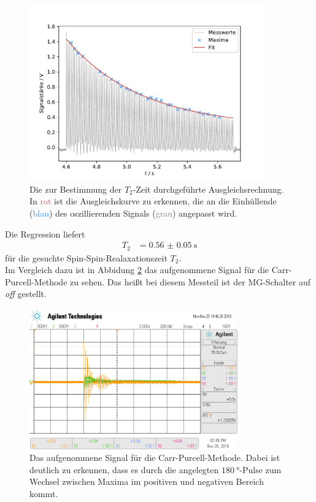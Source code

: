 \begin{figure}[H]
  \centering
  \includegraphics[width=0.9\textwidth]{../Auswertung/T2_fit.pdf}
  \caption{Die zur Bestimmung der $T_2$-Zeit durchgeführte Ausgleichsrechnung. In \textcolor{indianred}{rot} ist die Ausgleichskurve zu erkennen,
  die an die Einhüllende (\textcolor{dodgerblue}{blau}) des oszillierenden Signals (\textcolor{gray}{grau}) angepasst wird.}
  \label{fig:T2_fit}
\end{figure} \noindent
Die Regression liefert
\begin{align}
  T_2 &=  \SI{0.56(005)}{\second}
\end{align}
für die gesuchte Spin-Spin-Realaxationszeit $T_2$. \\
Im Vergleich dazu ist in Abbidung \ref{fig:t2_off} das aufgenommene Signal für die Carr-Purcell-Methode zu sehen. Das heißt bei diesem 
Messteil ist der MG-Schalter auf \textit{off} gestellt.
\begin{figure}[H]
  \centering
  \includegraphics[width=0.8\textwidth]{../data/scope_76.png}
  \caption{Das aufgenommene Signal für die Carr-Purcell-Methode. Dabei ist deutlich zu erkennen, dass es durch die angelegten
  $\SI{180}{\degree}$-Pulse zum Wechsel zwischen Maxima im positiven und negativen Bereich kommt.}
  \label{fig:t2_off}
\end{figure} \noindent
